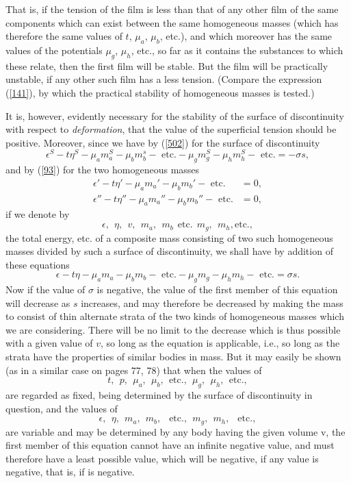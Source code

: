 \documentclass[12pt]{article}
\begin{document}
{That is, if the tension of the film is less than that of any other film of the same components which can exist between the same homogeneous masses (which has therefore the same values of $t$, $\mu_a$, $\mu_b$, etc.), and which moreover has the same values of the potentials $\mu_g$, $\mu_h$, etc., so far as it contains the substances to which these relate, then the first film will be stable. But the film will be practically unstable, if any other such film has a less tension. (Compare the expression (\ref{141}), by which the practical stability of homogeneous masses is tested.)

It is, however, evidently necessary for the stability of the surface of discontinuity with respect to \textit{deformation}, that the value of the superficial tension should be positive. Moreover, since we have by (\ref{502}) for the surface of discontinuity
$$ \epsilon^S-t\eta^S - \mu_a m_a^S -\mu_b m_b^s - \text{ etc.} - \mu_g m_g^S - \mu_h m_h^S - \text{ etc.} = -\sigma s, $$
and by (\ref{93}) for the two homogeneous masses
\begin{align*}
\epsilon'-t\eta' - \mu_a m_a' -\mu_b m_b' - \text{ etc.} &=0, \\
\epsilon''-t\eta'' - \mu_a m_a'' -\mu_b m_b'' - \text{ etc.} &= 0, \end{align*}
if we denote by
$$ \epsilon, \ \ \eta, \ \ v, \ \ m_a, \ \  m_b \ \ \text{etc.} \ \ m_g, \ \  m_h, \text{etc.}, $$
the total energy, etc. of a composite mass consisting of two such homogeneous masses divided by such a surface of discontinuity, we shall have by addition of these equations
$$ \epsilon-t\eta - \mu_a m_a -\mu_b m_b - \text{ etc.} - \mu_g m_g - \mu_h m_h - \text{ etc.} = \sigma s.$$
Now if the value of $\sigma$ is negative, the value of the first member of this equation will decrease as $s$ increases, and may therefore be decreased by making the mass to consist of thin alternate strata of the two kinds of homogeneous masses which we are considering. There will be no limit to the decrease which is thus possible with a given value of $v$, so long as the equation is applicable, i.e., so long as the strata have the properties of similar bodies in mass. But it may easily be shown (as in a similar case on pages 77, 78) that when the values of
$$ t, \ \  p, \ \ \mu_a, \ \ \mu_b, \ \ \text{etc.}, \ \ \mu_g, \ \  \mu_h, \ \ \text{etc.}, $$
are regarded as fixed, being determined by the surface of discontinuity in question, and the values of
$$ \epsilon, \ \ \eta, \ \ m_a, \ \ m_b,\ \ \text{ etc.}, \ \ m_g,\ \  m_h,\ \  \text{ etc.},$$
are variable and may be determined by any body having the given volume v, the first member of this equation cannot have an infinite negative value, and must therefore have a least possible value, which will be negative, if any value is negative, that is, if  is negative.


}
\end{document}
